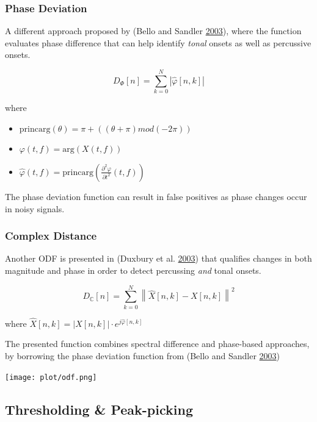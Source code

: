 \documentclass[american,]{article}
\providecommand{\tightlist}{%
  \setlength{\itemsep}{0pt}\setlength{\parskip}{0pt}}
\begin{document}
\hypertarget{phase-deviation}{%
\subsubsection{Phase Deviation}\label{phase-deviation}}

A different approach proposed by (Bello and Sandler \protect\hyperlink{ref-bello}{2003}), where the function
evaluates phase difference that can help identify \emph{tonal}
onsets as well as percussive onsets.

\[D_{\Phi}[n] = \sum\limits_{k=0}^{N}
    \left\lvert \hat{\varphi}[n, k] \right\rvert\]

where

\begin{itemize}
\tightlist
\item
  \(\mathrm{princarg}(\theta) = \pi + ((\theta + \pi) mod (-2\pi))\)
\item
  \(\varphi(t, f) = \mathrm{arg}(X(t, f))\)
\item
  \(\hat{\varphi}(t, f) = \mathrm{princarg} \left( \frac{\partial^2 \varphi}{\partial t^2}(t, f) \right)\)
\end{itemize}

The phase deviation function can result in false positives as
phase changes occur in noisy signals.

\hypertarget{complex-distance}{%
\subsubsection{Complex Distance}\label{complex-distance}}

Another ODF is presented in (Duxbury et al. \protect\hyperlink{ref-duxbury}{2003}) that qualifies changes in both
magnitude and phase in order to detect percussing \emph{and} tonal onsets.

\[D_{\mathbb{C}}[n] = \sum\limits_{k=0}^{N}
    \left\lVert\hat{X}[n, k] - X[n, k]\right\rVert^2\]

where
\(\hat{X}[n, k] = \left\lvert X[n, k]\right\rvert \cdot e^{j\hat{\varphi}[n, k]}\)

The presented function combines spectral difference and phase-based approaches,
by borrowing the phase deviation function from (Bello and Sandler \protect\hyperlink{ref-bello}{2003})

\texttt{[image: plot/odf.png]}

\hypertarget{thresholding-peak-picking}{%
\subsection{Thresholding \& Peak-picking}\label{thresholding-peak-picking}}
\end{document}
